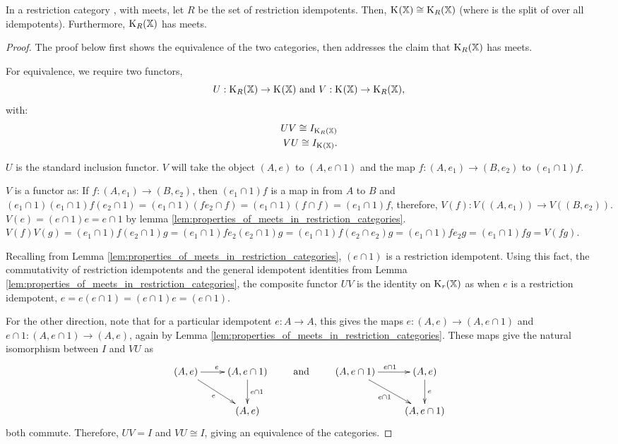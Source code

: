 \begin{proposition}\label{pro:in_rc_x_with_meets_split_x_is_cong_to_split_r_x}
In a restriction category \X, with meets, let $R$ be the set of restriction idempotents.
Then, $\text{K}_{}(\mathbb{X}) \cong \text{K}_{R}(\mathbb{X})$
(where \spl{}{\X} is the split of \X over all idempotents). Furthermore,
$\text{K}_{R}(\mathbb{X})$ has meets.
\end{proposition}
\begin{proof}
The proof below first shows the equivalence of the two categories, then addresses the claim that
$\text{K}_{R}(\mathbb{X})$ has meets.

For equivalence, we require two functors,
\[U:\text{K}_{R}(\mathbb{X})\to\text{K}_{}(\mathbb{X})\text{ and }V:\text{K}_{}(\mathbb{X})\to\text{K}_{R}(\mathbb{X}),\]
with:
\begin{align}
  U V \cong I_{\text{K}_{R}(\mathbb{X})}\\
  V U \cong I_{\text{K}_{}(\mathbb{X})}.
\end{align}


$U$ is the standard inclusion functor. $V$ will take the object $(A,e)$ to
$(A,e\cap 1)$ and the map $f:(A,e_1)\to (B,e_2)$ to $(e_1\cap 1)f $.

$V$ is a functor as:
\bd
{} If  $f:(A,e_1) \to (B,e_2)$, then
$(e_1\cap 1) f $ is a map in \X from $A$ to $B$ and
$ (e_1\cap 1)(e_1\cap 1) f  (e_2 \cap 1) =
(e_1\cap 1) (f  e_2 \cap f ) = (e_1\cap 1) (f \cap f)= (e_1\cap 1) f$, therefore,
$V(f):V((A,e_1)) \to V((B,e_2))$.
 $V(e) = (e\cap 1 ) e = e \cap 1$ by
lemma \ref{lem:properties_of_meets_in_restriction_categories}.
 $V(f) V(g)
= (e_1\cap 1 ) f (e_2 \cap 1) g
= (e_1\cap 1 ) f e_2 (e_2 \cap 1) g
= (e_1\cap 1 ) f  (e_2 \cap e_{2}) g
= (e_1\cap 1 ) f e_2 g
= (e_1\cap 1 ) f g
= V(f g)$.
\ed

Recalling from Lemma \ref{lem:properties_of_meets_in_restriction_categories}, $(e\cap 1)$ is a restriction
 idempotent. Using this fact, the commutativity of restriction idempotents
and the general idempotent identities from  Lemma \ref{lem:properties_of_meets_in_restriction_categories}, the
composite functor $U V$ is the identity on $\text{K}_{r}(\mathbb{X})$ as when $e$ is a
restriction idempotent,
$e = e (e\cap 1) = (e\cap 1) e = (e\cap 1)$.

For the other direction,  note that for a particular idempotent $e:A\to A$,
this gives the maps $e:(A,e)\to(A,e\cap 1)$ and
$e\cap 1 : (A,e\cap 1) \to (A,e)$, again by Lemma \ref{lem:properties_of_meets_in_restriction_categories}.
These maps give the natural isomorphism between $I$ and $V U$ as
\[\xymatrix{
(A,e)\ar[r]^e \ar[dr]_{e} &(A,e\cap 1)\ar[d]^{e\cap 1}\\
&(A,e) }\qquad
\text{ and  }\qquad
\xymatrix{
(A,e\cap 1)\ar[r]^{e\cap 1} \ar[dr]_{e\cap 1} &(A,e)\ar[d]^{e}\\
&(A,e\cap 1) }
\]
both commute. Therefore, $U V = I$ and $V U \cong I$, giving
an equivalence of the categories.


\end{proof}
